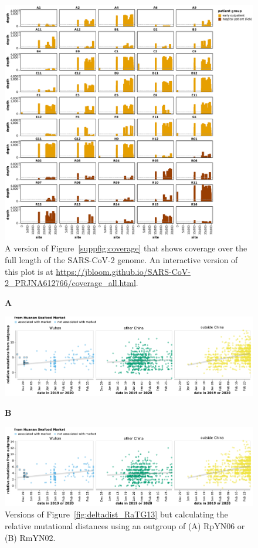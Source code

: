 \documentclass[9pt,twocolumn,twoside]{gsajnl_modified}
\begin{document}
\begin{figure}[h!]
\centering
\includegraphics[width=\linewidth]{figures/coverage_all.pdf}
\caption{A version of Figure~\ref{suppfig:coverage} that shows coverage over the full length of the SARS-CoV-2 genome.
An interactive version of this plot is at \url{https://jbloom.github.io/SARS-CoV-2_PRJNA612766/coverage_all.html}.
}
\label{suppfig:coverage_all}
\end{figure}

\begin{figure}[h!]
{\bf \LARGE A} \\
\centerline{\includegraphics[width=\linewidth]{figures/deltadist_RpYN06.pdf}}
{\bf \LARGE B} \\
\centerline{\includegraphics[width=\linewidth]{figures/deltadist_RmYN02.pdf}}
\caption{Versions of Figure~\ref{fig:deltadist_RaTG13} but calculating the relative mutational distances using an outgroup of (A) RpYN06 or (B) RmYN02.
}
\label{suppfig:deltadist_RpYN06_RmYN02}
\end{figure}
\end{document}
